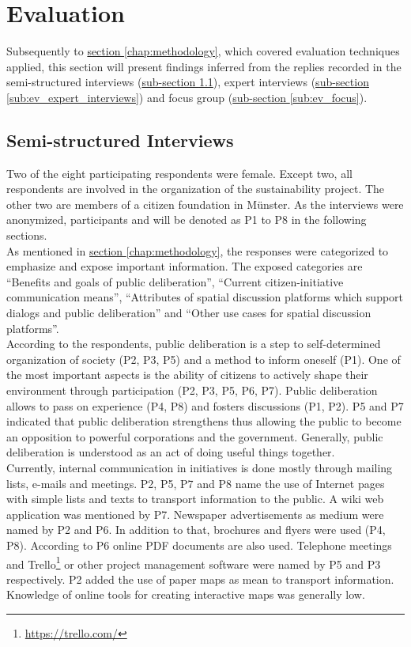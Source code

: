 \section{Evaluation}
\label{chap:evaluation}
Subsequently to \hyperref[chap:methodology]{section \ref{chap:methodology}}, which covered evaluation techniques applied, this section will present findings inferred from the replies recorded in the semi-structured interviews (\hyperref[sub:ev_interviews]{sub-section \ref{sub:ev_interviews}}), expert interviews (\hyperref[sub:ev_expert_interviews]{sub-section \ref{sub:ev_expert_interviews}}) and focus group (\hyperref[sub:ev_focus]{sub-section \ref{sub:ev_focus}}).

\subsection{Semi-structured Interviews}
\label{sub:ev_interviews}
Two of the eight participating respondents were female. Except two, all respondents are involved in the organization of the sustainability project. The other two are members of a citizen foundation in M{\"u}nster. As the interviews were anonymized, participants and will be denoted as P1 to P8 in the following sections.\\
As mentioned in \hyperref[chap:methodology]{section \ref{chap:methodology}}, the responses were categorized to emphasize and expose important information. The exposed categories are ``Benefits and goals of public deliberation'', ``Current citizen-initiative communication means'', ``Attributes of spatial discussion platforms which support dialogs and public deliberation'' and ``Other use cases for spatial discussion platforms''.\\
According to the respondents, public deliberation is a step to self-determined organization of society (P2, P3, P5) and a method to inform oneself (P1). One of the most important aspects is the ability of citizens to actively shape their environment through participation (P2, P3, P5, P6, P7). Public deliberation allows to pass on experience (P4, P8) and fosters discussions (P1, P2). P5 and P7 indicated that public deliberation strengthens thus allowing the public to become an opposition to powerful corporations and the government. Generally, public deliberation is understood as an act of doing useful things together.\\
Currently, internal communication in initiatives is done mostly through mailing lists, e-mails and meetings. P2, P5, P7 and P8 name the use of Internet pages with simple lists and texts to transport information to the public. A wiki web application was mentioned by P7. Newspaper advertisements as medium were named by P2 and P6. In addition to that, brochures and flyers were used (P4, P8). According to P6 online PDF documents are also used. Telephone meetings and Trello\footnote{\url{https://trello.com/}} or other project management software were named by P5 and P3 respectively. P2 added the use of paper maps as mean to transport information. Knowledge of online tools for creating interactive maps was generally low.\\
